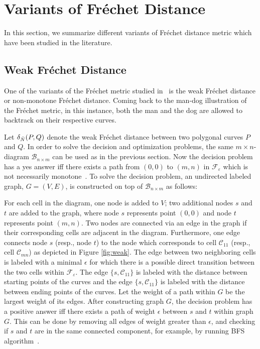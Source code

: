 \documentclass[12pt]{dalthesis}
\newcommand{\eps}{\varepsilon}
\newcommand{\CF}{{\mathscr F}}
\newcommand{\CB}{{\mathscr B}}
\newcommand{\CC}{{\mathscr C}}
\newcommand{\Frechet}{Fr\'echet }
\newcommand{\cell}[1]{{\CC_{#1}}}
\newcommand{\BNM}{\CB_{n \times m}}
\newcommand{\Feps}{\CF_\eps}
\begin{document}
\section{Variants of \Frechet Distance}

In this section, we summarize different variants 
of \Frechet distance metric
which have been studied in the literature.



\subsection{Weak \Frechet Distance}

One of the variants of the \Frechet metric studied in~\cite{AltG95} is the weak \Frechet
distance or non-monotone \Frechet distance. Coming back to the man-dog illustration 
of the \Frechet metric, in this instance,  
both the man and the dog are allowed to 
backtrack on their respective curves.

Let $\delta_{\bar{N}}(P,Q)$ denote the weak \Frechet distance between two polygonal curves $P$
and $Q$. In order to solve the decision and optimization problems, 
the same $m\times n$-diagram $\BNM$
can be used as in the previous section. 
Now the decision problem has a yes answer iff 
there exists a path from $(0,0)$ to $(m,n)$ in $\Feps$ which is not necessarily monotone~\cite{AltG95}. 
To solve the decision problem, an undirected labeled graph, $G=(V,E)$, is constructed 
on top of $\BNM$ as follows:

For each cell in the diagram, one node is added to $V$; two additional nodes $s$ and $t$
are added to the graph, where node $s$ represents point $(0,0)$
and node $t$ represents point $(m,n)$.
Two nodes are connected via an edge in the graph 
if their corresponding cells are adjacent in the diagram.
Furthermore, one edge connects node $s$ (resp., node $t$)  
to the node which corresponds to cell $\cell{11}$ 
(resp., cell $\cell{mn}$) as  depicted in Figure \ref{fig:weak}. 
The edge between two neighboring cells is labeled with a minimal $\epsilon$
for which there is a possible direct transition between the two cells within $\Feps$.
The edge $\{s,\cell{11} \}$ is labeled with the distance between starting points of the curves
and the edge  $\{s,\cell{11} \}$ is labeled with the distance between ending points of the curves. 
Let the weight of a path within $G$ be the largest weight of its edges. After constructing graph $G$, the decision problem has a positive answer 
iff there exists a path of weight $\epsilon$ between $s$ and $t$ within graph $G$.
This can be done by removing all edges of weight greater than $\epsilon$, 
and checking if $s$ and $t$ are in the same connected component, 
for example, by running BFS algorithm~\cite{AltG95}.
\end{document}
